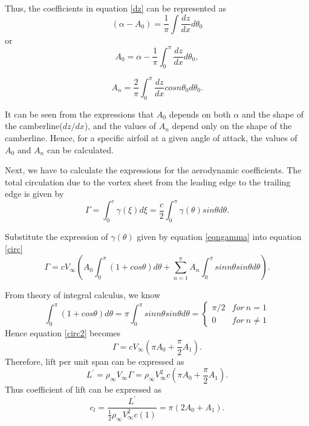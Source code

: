 \documentclass[letterpaper,12pt]{article}
\begin{document}
Thus, the coefficients in equation \ref{dz} can be represented as
\[
(\alpha - A_0) = \frac{1}{\pi}\int\frac{dz}{dx}d\theta_0
\]
or
\begin{equation}
A_0 = \alpha - \frac{1}{\pi}\int_0^\pi\frac{dz}{dx}d\theta_0,
\label{A0}
\end{equation}

\begin{equation}
A_n = \frac{2}{\pi}\int_0^\pi\frac{dz}{dx}cosn\theta_0d\theta_0.
\label{AN}
\end{equation}

It can be seen from the expressions that $A_0$ depends on both $\alpha$ and the shape of the camberline($dz/dx$), and the values of $A_n$ depend only on the shape of the camberline. Hence, for a specific airfoil at a given angle of attack, the values of $A_0$ and $A_n$ can be calculated.

Next, we have to calculate the expressions for the aerodynamic coefficients. The total circulation due to the vortex sheet from the leading edge to the trailing edge is given by
\begin{equation}
\Gamma = \int_0^c\gamma(\xi)d\xi = \frac{c}{2}\int_0^\pi\gamma(\theta)sin\theta d\theta.
\label{circ}
\end{equation}

Substitute the expression of $\gamma(\theta)$ given by equation \ref{eqngamma} into equation \ref{circ}
\begin{equation}
\Gamma = cV_\infty \left(A_0\int_0^\pi(1+cos\theta)d\theta + \sum_{n=1}^\pi A_n\int_0^\pi sinn\theta sin\theta d\theta\right).
\label{circ2}
\end{equation}

From theory of integral calculus, we know
\[
\int_0^\pi (1+cos\theta)d\theta = \pi
\int_0^\pi sinn\theta sin\theta d\theta =
\begin{cases}
\pi/2 &for\ n=1\\
0 &for\ n\neq1
\end{cases}
\]
Hence equation \ref{circ2} becomes
\begin{equation}
\Gamma = cV_\infty \left(\pi A_0 + \frac{\pi}{2} A_1\right).
\end{equation}
Therefore, lift per unit span can be expressed as
\begin{equation}
L^{'} = \rho_\infty V_\infty \Gamma = \rho_\infty V_\infty^2 c \left(\pi A_0 + \frac{\pi}{2}A_1\right).
\end{equation}
Thus coefficient of lift can be expressed as
\begin{equation}
c_l = \frac{L^{'}}{\frac{1}{2}\rho_\infty V_\infty^2c(1)} = \pi(2A_0 + A_1).
\label{CL}
\end{equation}
\end{document}
